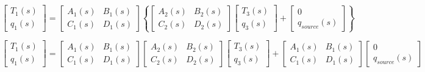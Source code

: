 \begin{equation}
\left[ {\begin{array}{ccc}{{T_1}\left( s \right)}\\ {{q_1}\left( s \right)}\end{array}} \right] = \left[ {\begin{array}{ccc}{{A_1}\left( s \right)}&{{B_1}\left( s \right)}\\ {{C_1}\left( s \right)}&{{D_1}\left( s \right)}\end{array}} \right]\left\{ {\left[ {\begin{array}{ccc}{{A_2}\left( s \right)}&{{B_2}\left( s \right)}\\ {{C_2}\left( s \right)}&{{D_2}\left( s \right)}\end{array}} \right]\left[ {\begin{array}{ccc}{{T_3}\left( s \right)}\\ {{q_3}\left( s \right)}\end{array}} \right] + \left[ {\begin{array}{ccc}0\\ {{q_{source}}\left( s \right)}\end{array}} \right]} \right\}
\end{equation}

\begin{equation}
\left[ {\begin{array}{ccc}{{T_1}\left( s \right)}\\ {{q_1}\left( s \right)}\end{array}} \right] = \left[ {\begin{array}{ccc}{{A_1}\left( s \right)}&{{B_1}\left( s \right)}\\ {{C_1}\left( s \right)}&{{D_1}\left( s \right)}\end{array}} \right]\left[ {\begin{array}{ccc}{{A_2}\left( s \right)}&{{B_2}\left( s \right)}\\ {{C_2}\left( s \right)}&{{D_2}\left( s \right)}\end{array}} \right]\left[ {\begin{array}{ccc}{{T_3}\left( s \right)}\\ {{q_3}\left( s \right)}\end{array}} \right] + \left[ {\begin{array}{ccc}{{A_1}\left( s \right)}&{{B_1}\left( s \right)}\\ {{C_1}\left( s \right)}&{{D_1}\left( s \right)}\end{array}} \right]\left[ {\begin{array}{ccc}0\\ {{q_{source}}\left( s \right)}\end{array}} \right]
\label{eq:TwoLayerEquivalentQTFLaplaceForm}
\end{equation}

